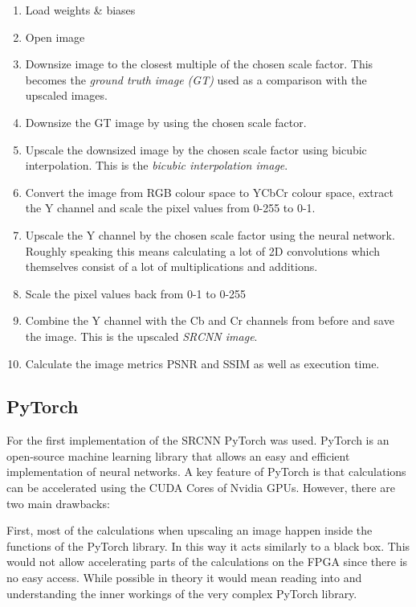 \documentclass[
			fontsize = 12pt,
			paper = a4
			]
			{scrartcl}%
\newcommand{\?}{\ensuremath{^\texttt{\textbf [CITATION~NEEDED]}}}
\begin{document}
\begin{enumerate}
    \item Load weights \& biases
    \item Open image
    \item Downsize image to the closest multiple of the chosen scale factor. This becomes the \emph{ground truth image (GT)} used as a comparison with the upscaled images.
    \item Downsize the GT image by using the chosen scale factor.
    \item Upscale the downsized image by the chosen scale factor using bicubic interpolation. This is the \emph{bicubic interpolation image}.
    \item Convert the image from RGB colour space to YCbCr colour space, extract the Y channel and scale the pixel values from 0-255 to 0-1.
    \item Upscale the Y channel by the chosen scale factor using the neural network. Roughly speaking this means calculating a lot of 2D convolutions which themselves consist of a lot of multiplications and additions.
    \item Scale the pixel values back from 0-1 to 0-255
    \item Combine the Y channel with the Cb and Cr channels from before and save the image. This is the upscaled \emph{SRCNN image}.
    \item Calculate the image metrics PSNR and SSIM as well as execution time.
\end{enumerate}

\subsection{PyTorch}
\label{sec:Torch}
For the first implementation of the SRCNN PyTorch was used. PyTorch is an open-source machine learning library that allows an easy and efficient implementation of neural networks. A key feature of PyTorch is that calculations can be accelerated using the CUDA Cores of Nvidia GPUs. However, there are two main drawbacks:

First, most of the calculations when upscaling an image happen inside the functions of the PyTorch library. In this way it acts similarly to a black box. This would not allow accelerating parts of the calculations on the FPGA since there is no easy access. While possible in theory it would mean reading into and understanding the inner workings of the very complex PyTorch library.
\end{document}
